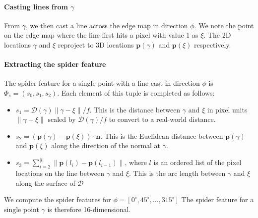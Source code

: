 \documentclass[10pt,twocolumn,letterpaper]{article}
\newcommand{\degree}{^{\circ}}
\newcommand{\rgbdimage}{\mathcal{D}}
\newcommand{\pixelidx}{\gamma}
\newcommand{\edgeimidx}{\xi}
\newcommand{\project}{\mathbf{p}}
\newcommand{\point}{\mathbf{p}}
\newcommand{\normal}{\mathbf{n}}
\begin{document}
\paragraph{Casting lines from $\pixelidx$}
From $\pixelidx$, we then cast a line across the edge map in direction $\phi$.
We note the point on the edge map where the line first hits a pixel with value 1 as $\edgeimidx$.
The 2D locations $\pixelidx$ and $\edgeimidx$ reproject to 3D locations $\project(\pixelidx)$ and $\project(\edgeimidx)$ respectively.

\paragraph{Extracting the spider feature}

\newcommand{\spiderfeat}{s}

The spider feature for a single point with a line cast in direction $\phi$ is $\Phi_s = (\spiderfeat_0, \spiderfeat_1, \spiderfeat_2)$.
Each element of this tuple is completed as follows:
\begin{itemize}

\item $\spiderfeat_1 = \rgbdimage(\pixelidx) \|\pixelidx - \edgeimidx\| / f$. This is the distance between $\pixelidx$ and $\edgeimidx$ in pixel units $\|\pixelidx - \edgeimidx\|$ scaled by $\rgbdimage(\pixelidx) / f$ to convert to a real-world distance.

\item $\spiderfeat_2 = (\point(\pixelidx) - \point(\edgeimidx)) \cdot \normal$. 
This is the Euclidean distance between $\point(\pixelidx)$ and $\point(\edgeimidx)$ along the direction of the normal at $\pixelidx$.

\item $\spiderfeat_3 = \sum_{i=2}^{|l|} \| \project(l_i) - \project(l_{i-1}) \| $, where $l$ is an ordered list of the pixel locations on the line between $\pixelidx$ and $\edgeimidx$.
This is the arc length between $\pixelidx$ and $\edgeimidx$ along the surface of $\rgbdimage$
\end{itemize}


We compute the spider features for  $\phi = [0\degree, 45\degree, \ldots, 315\degree]$
The spider feature for a single point $\pixelidx$ is therefore 16-dimensional.
\end{document}
